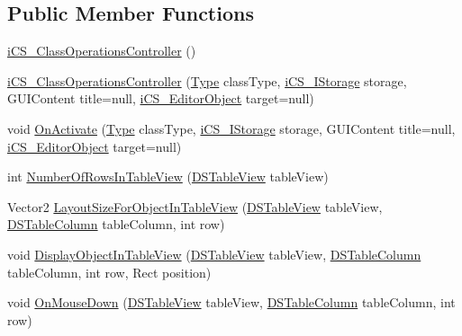 \subsection*{Public Member Functions}
\begin{DoxyCompactItemize}
\item 
\hyperlink{classi_c_s___class_operations_controller_a76b678728d9243aa1aec214fd2940fa0}{i\+C\+S\+\_\+\+Class\+Operations\+Controller} ()
\item 
\hyperlink{classi_c_s___class_operations_controller_a3b0025badd561fb4309a57a7cc881688}{i\+C\+S\+\_\+\+Class\+Operations\+Controller} (\hyperlink{i_c_s___object_type_enum_8cs_ae6c3dd6d8597380b56d94908eb431547aa1fa27779242b4902f7ae3bdd5c6d508}{Type} class\+Type, \hyperlink{classi_c_s___i_storage}{i\+C\+S\+\_\+\+I\+Storage} storage, G\+U\+I\+Content title=null, \hyperlink{classi_c_s___editor_object}{i\+C\+S\+\_\+\+Editor\+Object} target=null)
\item 
void \hyperlink{classi_c_s___class_operations_controller_acb3782301f9f18174c063356ca76abeb}{On\+Activate} (\hyperlink{i_c_s___object_type_enum_8cs_ae6c3dd6d8597380b56d94908eb431547aa1fa27779242b4902f7ae3bdd5c6d508}{Type} class\+Type, \hyperlink{classi_c_s___i_storage}{i\+C\+S\+\_\+\+I\+Storage} storage, G\+U\+I\+Content title=null, \hyperlink{classi_c_s___editor_object}{i\+C\+S\+\_\+\+Editor\+Object} target=null)
\item 
int \hyperlink{classi_c_s___class_operations_controller_a69f2bafe9e4f6d7d38c5ce0b67a180de}{Number\+Of\+Rows\+In\+Table\+View} (\hyperlink{class_d_s_table_view}{D\+S\+Table\+View} table\+View)
\item 
Vector2 \hyperlink{classi_c_s___class_operations_controller_a8db66ba0bb8d58b8d71f8b54ab54b9ff}{Layout\+Size\+For\+Object\+In\+Table\+View} (\hyperlink{class_d_s_table_view}{D\+S\+Table\+View} table\+View, \hyperlink{class_d_s_table_column}{D\+S\+Table\+Column} table\+Column, int row)
\item 
void \hyperlink{classi_c_s___class_operations_controller_a168790ee31b3dace185d21d9732ff471}{Display\+Object\+In\+Table\+View} (\hyperlink{class_d_s_table_view}{D\+S\+Table\+View} table\+View, \hyperlink{class_d_s_table_column}{D\+S\+Table\+Column} table\+Column, int row, Rect position)
\item 
void \hyperlink{classi_c_s___class_operations_controller_abf7cf96f6bebf93e2b475e9b93a77e2d}{On\+Mouse\+Down} (\hyperlink{class_d_s_table_view}{D\+S\+Table\+View} table\+View, \hyperlink{class_d_s_table_column}{D\+S\+Table\+Column} table\+Column, int row)
\end{DoxyCompactItemize}
